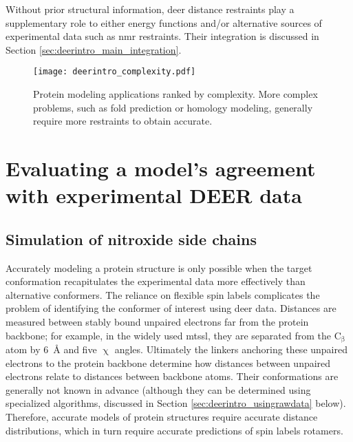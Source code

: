 Without prior structural information, \gls{deer} distance restraints play a supplementary role to either energy functions and/or alternative sources of experimental data such as \gls{nmr} restraints. Their integration is discussed in Section \ref{sec:deerintro_main_integration}.

\begin{wrapfigure}{R}{0.4\textwidth}
\centering
\texttt{[image: deerintro\_complexity.pdf]}
 \caption[Protein modeling applications ranked by complexity.]{Protein modeling applications ranked by complexity. More complex problems, such as fold prediction or homology modeling, generally require more restraints to obtain accurate.}
\label{fig:deerintro_complexity}
\end{wrapfigure}

\section{Evaluating a model's agreement with experimental DEER data}

\subsection{Simulation of nitroxide side chains}\label{sec:deerintro_rotamers}

Accurately modeling a protein structure is only possible when the target conformation recapitulates the experimental data more effectively than alternative conformers. The reliance on flexible spin labels complicates the problem of identifying the conformer of interest using \gls{deer} data. Distances are measured between stably bound unpaired electrons far from the protein backbone; for example, in the widely used \gls{mtssl}, they are separated from the $\mathrm{C_{\upbeta}}$ atom by \SI{6}{\angstrom} and five $\upchi$ angles. Ultimately the linkers anchoring these unpaired electrons to the protein backbone determine how distances between unpaired electrons relate to distances between backbone atoms. Their conformations are generally not known in advance (although they can be determined using specialized algorithms, discussed in Section \ref{sec:deerintro_usingrawdata} below). Therefore, accurate models of protein structures require accurate distance distributions, which in turn require accurate predictions of spin labels rotamers.

